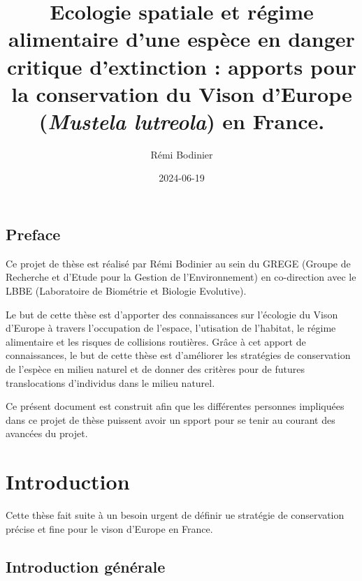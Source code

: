 \documentclass[
  letterpaper,
  DIV=11,
  numbers=noendperiod]{scrreprt}
\title{Ecologie spatiale et régime alimentaire d'une espèce en danger
critique d'extinction : apports pour la conservation du Vison d'Europe
(\emph{Mustela lutreola}) en France.}
\author{Rémi Bodinier}
\date{2024-06-19}
\renewcommand*\contentsname{Table of contents}
\newcommand\contentsname{Table of contents}
\begin{document}
\maketitle

\renewcommand*\contentsname{Table of contents}
{
\hypersetup{linkcolor=}
\setcounter{tocdepth}{2}
\tableofcontents
}

\chapter*{Preface}\label{preface}


Ce projet de thèse est réalisé par Rémi Bodinier au sein du GREGE
(Groupe de Recherche et d'Etude pour la Gestion de l'Environnement) en
co-direction avec le LBBE (Laboratoire de Biométrie et Biologie
Evolutive).

Le but de cette thèse est d'apporter des connaissances sur l'écologie du
Vison d'Europe à travers l'occupation de l'espace, l'utisation de
l'habitat, le régime alimentaire et les risques de collisions routières.
Grâce à cet apport de connaissances, le but de cette thèse est
d'améliorer les stratégies de conservation de l'espèce en milieu naturel
et de donner des critères pour de futures translocations d'individus
dans le milieu naturel.

Ce présent document est construit afin que les différentes personnes
impliquées dans ce projet de thèse puissent avoir un spport pour se
tenir au courant des avancées du projet.

\part{Introduction}

Cette thèse fait suite à un besoin urgent de définir ue stratégie de
conservation précise et fine pour le vison d'Europe en France.

\chapter{Introduction générale}\label{introduction-guxe9nuxe9rale}
\end{document}

